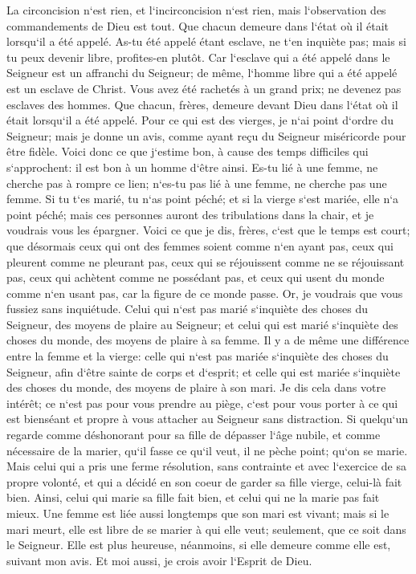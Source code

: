 \verse La circoncision n`est rien, et l`incirconcision n`est rien, mais l`observation des commandements de Dieu est tout. 
\verse Que chacun demeure dans l`état où il était lorsqu`il a été appelé. 
\verse As-tu été appelé étant esclave, ne t`en inquiète pas; mais si tu peux devenir libre, profites-en plutôt. 
\verse Car l`esclave qui a été appelé dans le Seigneur est un affranchi du Seigneur; de même, l`homme libre qui a été appelé est un esclave de Christ. 
\verse Vous avez été rachetés à un grand prix; ne devenez pas esclaves des hommes. 
\verse Que chacun, frères, demeure devant Dieu dans l`état où il était lorsqu`il a été appelé. 
\verse Pour ce qui est des vierges, je n`ai point d`ordre du Seigneur; mais je donne un avis, comme ayant reçu du Seigneur miséricorde pour être fidèle. 
\verse Voici donc ce que j`estime bon, à cause des temps difficiles qui s`approchent: il est bon à un homme d`être ainsi. 
\verse Es-tu lié à une femme, ne cherche pas à rompre ce lien; n`es-tu pas lié à une femme, ne cherche pas une femme. 
\verse Si tu t`es marié, tu n`as point péché; et si la vierge s`est mariée, elle n`a point péché; mais ces personnes auront des tribulations dans la chair, et je voudrais vous les épargner. 
\verse Voici ce que je dis, frères, c`est que le temps est court; que désormais ceux qui ont des femmes soient comme n`en ayant pas, 
\verse ceux qui pleurent comme ne pleurant pas, ceux qui se réjouissent comme ne se réjouissant pas, ceux qui achètent comme ne possédant pas, 
\verse et ceux qui usent du monde comme n`en usant pas, car la figure de ce monde passe. 
\verse Or, je voudrais que vous fussiez sans inquiétude. Celui qui n`est pas marié s`inquiète des choses du Seigneur, des moyens de plaire au Seigneur; 
\verse et celui qui est marié s`inquiète des choses du monde, des moyens de plaire à sa femme. 
\verse Il y a de même une différence entre la femme et la vierge: celle qui n`est pas mariée s`inquiète des choses du Seigneur, afin d`être sainte de corps et d`esprit; et celle qui est mariée s`inquiète des choses du monde, des moyens de plaire à son mari. 
\verse Je dis cela dans votre intérêt; ce n`est pas pour vous prendre au piège, c`est pour vous porter à ce qui est bienséant et propre à vous attacher au Seigneur sans distraction. 
\verse Si quelqu`un regarde comme déshonorant pour sa fille de dépasser l`âge nubile, et comme nécessaire de la marier, qu`il fasse ce qu`il veut, il ne pèche point; qu`on se marie. 
\verse Mais celui qui a pris une ferme résolution, sans contrainte et avec l`exercice de sa propre volonté, et qui a décidé en son coeur de garder sa fille vierge, celui-là fait bien. 
\verse Ainsi, celui qui marie sa fille fait bien, et celui qui ne la marie pas fait mieux. 
\verse Une femme est liée aussi longtemps que son mari est vivant; mais si le mari meurt, elle est libre de se marier à qui elle veut; seulement, que ce soit dans le Seigneur. 
\verse Elle est plus heureuse, néanmoins, si elle demeure comme elle est, suivant mon avis. Et moi aussi, je crois avoir l`Esprit de Dieu. 

